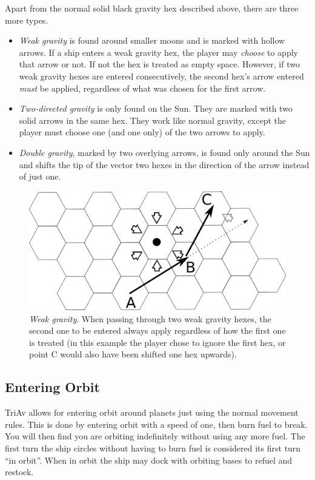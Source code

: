 \documentclass[a4paper,12pt,notitlepage,twocolumn]{article}
\begin{document}
Apart from the normal solid black gravity hex described above, there
are three more types. 

\begin{itemize}
\item \emph{Weak gravity} is found around smaller moons and is marked with
  hollow arrows. If a ship enters a weak gravity hex, the player may
  \emph{choose} to apply that arrow or not. If not the hex is treated as
  empty space. However, if two weak gravity hexes are entered
  consecutively, the second hex's arrow entered \emph{must} be
  applied, regardless of what was chosen for the first arrow.

\item \emph{Two-directed gravity} is only found on the Sun. They are
  marked with two solid arrows in the same hex. They work like normal
  gravity, except the player must choose one (and one only) of the two
  arrows to apply.

\item  \emph{Double gravity}, marked by two overlying arrows, is found only
  around the Sun and shifts the tip of the vector two hexes in the
  direction of the arrow instead of just one.
\end{itemize}
\begin{figure}[h!]\centering  
  \includegraphics[width=0.5 \textwidth]{data/move_7.eps}  
  \caption{\footnotesize \emph{Weak gravity}. When passing through two weak gravity hexes, the second one
  to be entered always apply regardless of how the first one is
  treated (in this example the player chose to ignore the first hex,
  or point C would also have been shifted one hex upwards).}
\label{fig:7}
\end{figure}

\subsection{Entering Orbit}

TriAv allows for entering orbit around planets just using the normal
movement rules. This is done by entering orbit with a speed of
one, then burn fuel to break. You will then find you are orbiting
indefinitely without using any more fuel. The first turn the ship circles
without having to burn fuel is considered its first turn ``in orbit''.
When in orbit the ship may dock with orbiting bases to refuel and restock.
\end{document}
